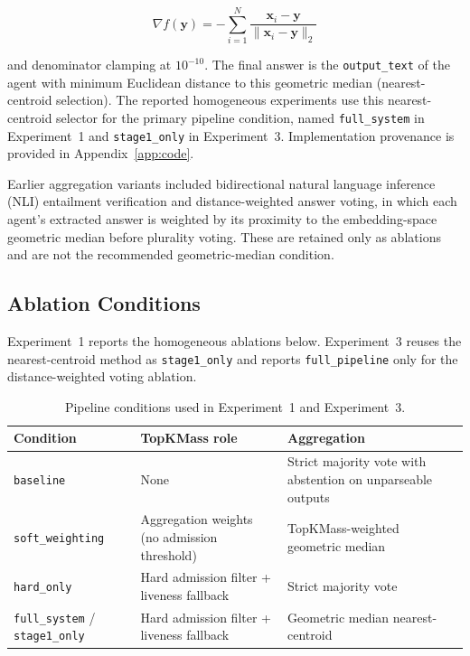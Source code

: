 \documentclass[11pt]{article}
\begin{document}
\begin{equation}
\nabla f(\mathbf{y}) = -\sum_{i=1}^{N}
  \frac{\mathbf{x}_i - \mathbf{y}}{\|\mathbf{x}_i - \mathbf{y}\|_2}
\label{eq:geomed-grad}
\end{equation}

and denominator clamping at $10^{-10}$. The final answer is the
\texttt{output\_text} of the agent with minimum Euclidean distance to this
geometric median (nearest-centroid selection). The reported homogeneous
experiments use this nearest-centroid selector for the primary pipeline
condition, named \texttt{full\_system} in Experiment~1 and \texttt{stage1\_only}
in Experiment~3. Implementation provenance is provided in Appendix~\ref{app:code}.

Earlier aggregation variants included bidirectional natural language inference
(NLI) entailment verification and distance-weighted answer voting, in which each
agent's extracted answer is weighted by its proximity to the embedding-space
geometric median before plurality voting. These are retained only as ablations
and are not the recommended geometric-median condition.

\subsection{Ablation Conditions}
\label{sec:conditions}

Experiment~1 reports the homogeneous ablations below. Experiment~3 reuses the
nearest-centroid method as \texttt{stage1\_only} and reports
\texttt{full\_pipeline} only for the distance-weighted voting ablation.

\begin{table}[!t]
\centering
\caption{Pipeline conditions used in Experiment~1 and Experiment~3.}
\label{tab:conditions}
{\footnotesize
\setlength{\tabcolsep}{5pt}
\renewcommand{\arraystretch}{1.08}
\begin{tabularx}{\textwidth}{p{}p{}X}
\toprule
\textbf{Condition} & \textbf{TopKMass role} & \textbf{Aggregation} \\
\midrule
\texttt{baseline}
  & None
  & Strict majority vote with abstention on unparseable outputs \\[4pt]
\texttt{soft\_weighting}
  & Aggregation weights (no admission threshold)
  & TopKMass-weighted geometric median \\[4pt]
\texttt{hard\_only}
  & Hard admission filter + liveness fallback
  & Strict majority vote \\[4pt]
\texttt{full\_system} / \texttt{stage1\_only}
  & Hard admission filter + liveness fallback
  & Geometric median nearest-centroid \\
\bottomrule
\end{tabularx}
}
\end{table}
\end{document}
